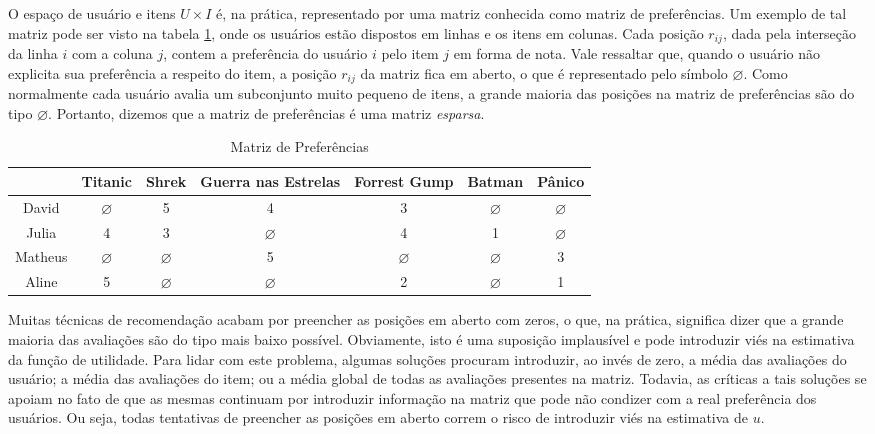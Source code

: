 O espaço de usuário e itens $U \times I$ é, na prática, representado por uma matriz conhecida como matriz de preferências. Um exemplo de tal matriz pode ser visto na tabela \ref{tab:preferencias}, onde os usuários estão dispostos em linhas e os itens em colunas. Cada posição $r_{ij}$, dada pela interseção da linha $i$ com a coluna $j$, contem a preferência do usuário $i$ pelo item $j$ em forma de nota. Vale ressaltar que, quando o usuário não explicita sua preferência a respeito do item, a posição $r_{ij}$ da matriz fica em aberto, o que é representado pelo símbolo $\varnothing$. Como normalmente cada usuário avalia um subconjunto muito pequeno de itens, a grande maioria das posições na matriz de preferências são do tipo $\varnothing$. Portanto, dizemos que a matriz de preferências é uma matriz \textit{esparsa}.

\begin{table}
  \begin{tabular}{| c | c | c | c | c | c | c |}
    \hline
           & Titanic & Shrek & Guerra nas Estrelas & Forrest Gump & Batman & Pânico\\ \hline
    David  & $\varnothing$ & 5 & 4 & 3 & $\varnothing$ & $\varnothing$\\ \hline
    Julia  & 4 & 3 & $\varnothing$ & 4 & 1 & $\varnothing$\\ \hline
    Matheus & $\varnothing$ & $\varnothing$ & 5 & $\varnothing$ & $\varnothing$ & 3\\ \hline
    Aline & 5 & $\varnothing$ & $\varnothing$ & 2 & $\varnothing$ & 1\\
    \hline
  \end{tabular}
  \caption{Matriz de Preferências}
  \label{tab:preferencias}
\end{table}

Muitas técnicas de recomendação acabam por preencher as posições em aberto com zeros, o que, na prática, significa dizer que a grande maioria das avaliações são do tipo mais baixo possível. Obviamente, isto é uma suposição implausível e pode introduzir viés na estimativa da função de utilidade. Para lidar com este problema, algumas soluções procuram introduzir, ao invés de zero, a média das avaliações do usuário; a média das avaliações do item; ou a média global de todas as avaliações presentes na matriz. Todavia, as críticas a tais soluções se apoiam no fato de que as mesmas continuam por introduzir informação na matriz que pode não condizer com a real preferência dos usuários. Ou seja, todas tentativas de preencher as posições em aberto correm o risco de introduzir viés na estimativa de $u$.

